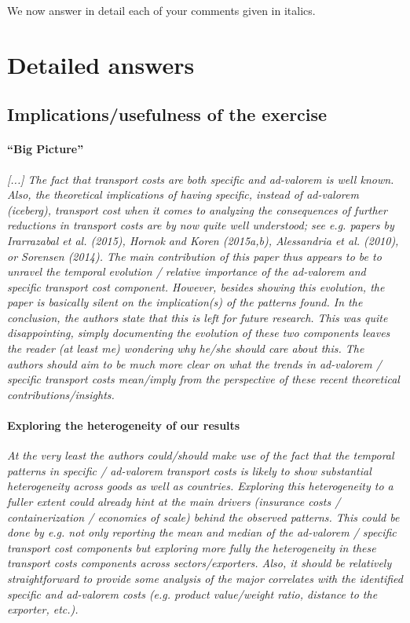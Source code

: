 \documentclass[a4paper,11pt]{article}
\begin{document}
We now answer in detail each of your comments given in italics.

\section{Detailed answers \label{sec:detailed_answers}}

\subsection{Implications/usefulness of the exercise}

\paragraph{``Big Picture''} \textit{[...] The fact that transport costs are both specific and ad-valorem is well known. Also, the theoretical implications of having specific, instead of ad-valorem (iceberg), transport cost when it comes to analyzing the consequences of further reductions in transport costs are by now quite well understood; see e.g. papers by Irarrazabal et al. (2015), Hornok and Koren (2015a,b), Alessandria et al. (2010), or Sorensen (2014). The main contribution of this paper thus appears to be to unravel the temporal evolution / relative importance of the ad-valorem and specific transport cost component. However, besides showing this evolution, the paper is basically silent on the implication(s) of the patterns found. In the conclusion, the authors state that this is left for future research. This was quite disappointing, simply documenting the evolution of these two components leaves the reader (at least me) wondering why he/she should care about this. The authors should aim to be much more clear on what the trends in ad-valorem / specific transport costs mean/imply from the perspective of these recent theoretical contributions/insights.}
\smallskip
\paragraph{Exploring the heterogeneity of our results} \textit{At the very least the authors could/should make use of the fact that the temporal patterns in specific / ad-valorem transport costs is likely to show substantial heterogeneity across goods as well as countries. Exploring this heterogeneity to a fuller extent could already hint at the main drivers (insurance costs / containerization / economies of scale) behind the observed patterns. This could be done by e.g. not only reporting the mean and median of the ad-valorem / specific transport cost components but exploring more fully the heterogeneity in these transport costs components across sectors/exporters. Also, it should be relatively straightforward to provide some analysis of the major correlates with the identified specific and ad-valorem costs (e.g. product value/weight ratio, distance to the exporter, etc.).}
\smallskip
\end{document}
